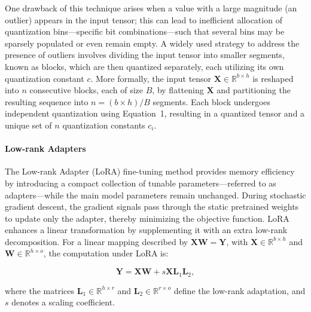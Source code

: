 One drawback of this technique arises when a value with a large magnitude (an outlier) appears in the input tensor; this can lead to inefficient allocation of quantization bins—specific bit combinations—such that several bins may be sparsely populated or even remain empty. A widely used strategy to address the presence of outliers involves dividing the input tensor into smaller segments, known as blocks, which are then quantized separately, each utilizing its own quantization constant $c$. More formally, the input tensor $\mathbf{X}\in \mathbb{R}^{b\times h}$ is reshaped into $n$ consecutive blocks, each of size $B$, by flattening $\mathbf{X}$ and partitioning the resulting sequence into ${n = ({b\times h} )/{B} }$ segments. Each block undergoes independent quantization using Equation~1, resulting in a quantized tensor and a unique set of $n$ quantization constants $c_i$.

\paragraph{Low-rank Adapters} The Low-rank Adapter (LoRA) fine-tuning method \citep{hu2021lora} provides memory efficiency by introducing a compact collection of tunable parameters—referred to as adapters—while the main model parameters remain unchanged. During stochastic gradient descent, the gradient signals pass through the static pretrained weights to update only the adapter, thereby minimizing the objective function. LoRA enhances a linear transformation by supplementing it with an extra low-rank decomposition. For a linear mapping described by ${\mathbf{X} \mathbf{W} = \mathbf{Y}}$, with $\mathbf{X}\in  \mathbb{R}^{b\times h}$ and $\mathbf{W}\in  \mathbb{R}^{h\times o}$, the computation under LoRA is:

\begin{equation}
    \mathbf{Y} = \mathbf{X}\mathbf{W} + s\mathbf{X}\mathbf{L}_1\mathbf{L}_2,
\end{equation}

where the matrices $\mathbf{L}_1\in  \mathbb{R}^{h\times r}$ and $\mathbf{L}_2\in  \mathbb{R}^{r\times o}$ define the low-rank adaptation, and $s$ denotes a scaling coefficient.


